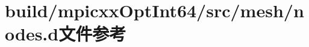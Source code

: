 \hypertarget{build_2mpicxxOptInt64_2src_2mesh_2nodes_8d}{
\section{build/mpicxxOptInt64/src/mesh/nodes.d文件参考}
\label{build_2mpicxxOptInt64_2src_2mesh_2nodes_8d}
}
